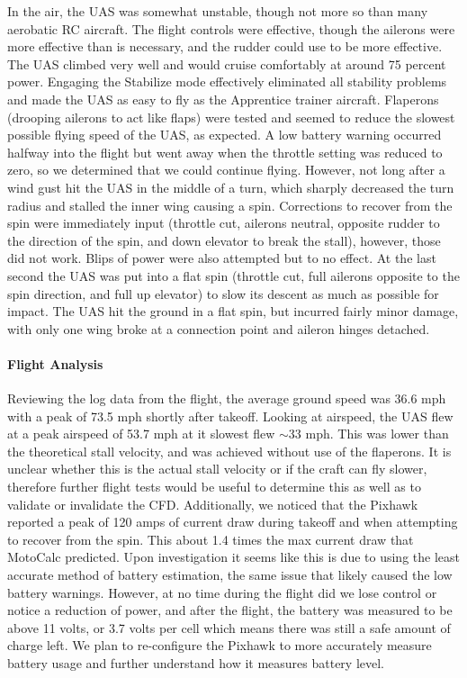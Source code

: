 \documentclass{article}
\begin{document}
In the air, the UAS was somewhat unstable, though not more so than many aerobatic RC aircraft. The flight controls were effective, though the ailerons were more effective than is necessary, and the rudder could use to be more effective. The UAS climbed very well and would cruise comfortably at around 75 percent power. Engaging the Stabilize mode effectively eliminated all stability problems and made the UAS as easy to fly as the Apprentice trainer aircraft. Flaperons (drooping ailerons to act like flaps) were tested and seemed to reduce the slowest possible flying speed of the UAS, as expected. A low battery warning occurred halfway into the flight but went away when the throttle setting was reduced to zero, so we determined that we could continue flying. However, not long after a wind gust hit the UAS in the middle of a turn, which sharply decreased the turn radius and stalled the inner wing causing a spin. Corrections to recover from the spin were immediately input (throttle cut, ailerons neutral, opposite rudder to the direction of the spin, and down elevator to break the stall), however, those did not work. Blips of power were also attempted but to no effect. At the last second the UAS was put into a flat spin (throttle cut, full ailerons opposite to the spin direction, and full up elevator) to slow its descent as much as possible for impact. The UAS hit the ground in a flat spin, but incurred fairly minor damage, with only one wing broke at a connection point and aileron hinges detached.

\paragraph{Flight Analysis}Reviewing the log data from the flight, the average ground speed was 36.6 mph with a peak of 73.5 mph shortly after takeoff. Looking at airspeed, the UAS flew at a peak airspeed of 53.7 mph at it slowest flew $\sim$33 mph. This was lower than the theoretical stall velocity, and was achieved without use of the flaperons. It is unclear whether this is the actual stall velocity or if the craft can fly slower, therefore further flight tests would be useful to determine this as well as to validate or invalidate the CFD. Additionally, we noticed that the Pixhawk reported a peak of 120 amps of current draw during takeoff and when attempting to recover from the spin. This about 1.4 times the max current draw that MotoCalc predicted. Upon investigation it seems like this is due to using the least accurate method of battery estimation, the same issue that likely caused the low battery warnings. However, at no time during the flight did we lose control or notice a reduction of power, and after the flight, the battery was measured to be above 11 volts, or 3.7 volts per cell which means there was still a safe amount of charge left. We plan to re-configure the Pixhawk to more accurately measure battery usage and further understand how it measures battery level.
\end{document}
